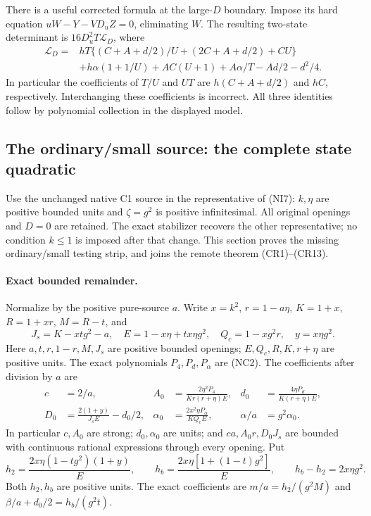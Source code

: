 There is a useful corrected formula at the large-$D$ boundary.
Impose its hard equation $uW-Y-VD_uZ=0$, eliminating $W$.
The resulting two-state determinant is $16D_u^2T\mathcal L_D$, where
\begin{align*}
\mathcal L_D={}&hT\{(C+A+d/2)/U+(2C+A+d/2)+CU\}\\
 &+h\alpha(1+1/U)+AC(U+1)+A\alpha/T-Ad/2-d^2/4.
                                                               \tag{CL6}
\end{align*}
In particular the coefficients of $T/U$ and $UT$ are
$h(C+A+d/2)$ and $hC$, respectively. Interchanging these coefficients
is incorrect. All three identities follow by polynomial collection in the displayed model.



\subsection{The ordinary/small source: the complete state quadratic}

\label{component:pa0b854a04f49}

\label{pa0b854a04f49:sec:r6-c1-ui}
Use the unchanged native C1 source in the representative of (NI7):
$k,\eta$ are positive bounded units and $\zeta=g^2$ is positive
infinitesimal. All original openings and $D=0$ are retained.
The exact stabilizer recovers the other representative; no condition
$k\le1$ is imposed after that change. This section proves the missing
ordinary/small testing strip, and joins the remote theorem (CR1)--(CR13).

\paragraph{Exact bounded remainder.}
Normalize by the positive pure-source $a$. Write $x=k^2$,
$r=1-a\eta$, $K=1+x$, $R=1+xr$, $M=R-t$, and
\[
 J_s=K-xtg^2-a,\quad E=1-x\eta+tx\eta g^2,\quad
 Q_c=1-xg^2r,\quad y=x\eta g^2.
\]
Here $a,t,r,1-r,M,J_s$ are positive bounded openings; $E,Q_c,R,K,r+\eta$
are positive units. The exact polynomials $P_4,P_d,P_\alpha$ are (NC2).
The coefficients after division by $a$ are
\[
\begin{aligned}
 c&=2/a,& A_0&=\frac{2\eta^2P_4}{Kr(r+\eta)E},&
 d_0&=\frac{4\eta P_d}{K(r+\eta)E},\\
 D_0&=\frac{2(1+y)}{J_sE}-d_0/2,&
 \alpha_0&=\frac{2x^2\eta P_\alpha}{KQ_cE},&
 \alpha/a&=g^2\alpha_0.
\end{aligned}                                                     \tag{CU1}
\]
In particular $c,A_0$ are strong; $d_0,\alpha_0$ are units; and
$ca,A_0r,D_0J_s$ are bounded with continuous rational expressions
through every opening. Put
\[
 h_2=\frac{2x\eta(1-tg^2)(1+y)}E,\qquad
 h_b=\frac{2x\eta[1+(1-t)g^2]}E,
 \qquad h_b-h_2=2x\eta g^2.
\]
Both $h_2,h_b$ are positive units. The exact coefficients are
$m/a=h_2/(g^2M)$ and $\beta/a+d_0/2=h_b/(g^2t)$.

